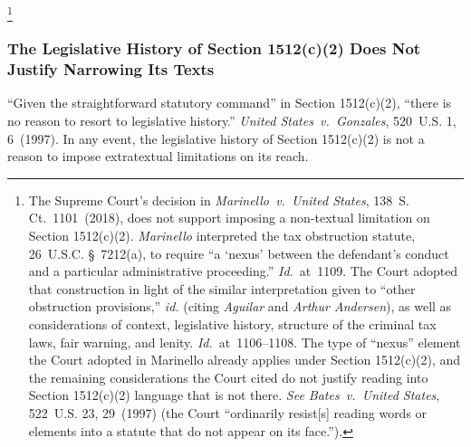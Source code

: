\footnote{The Supreme Court's decision in \textit{Marinello~v.\ United States}, 138~S. Ct.~1101~(2018), does not support imposing a non-textual limitation on Section 1512(c)(2).
\textit{Marinello} interpreted the tax obstruction statute, 26~U.S.C. \S~7212(a), to require ``a `nexus' between the defendant's conduct and a particular administrative proceeding.''
\textit{Id.}~at~1109.
The Court adopted that construction in light of the similar interpretation given to ``other obstruction provisions,'' \textit{id.} (citing \textit{Aguilar} and \textit{Arthur Andersen}), as well as considerations of context, legislative history, structure of the criminal tax laws, fair warning, and lenity.
\textit{Id.}~at~1106--1108.
The type of ``nexus'' element the Court adopted in Marinello already applies under Section 1512(c)(2), and the remaining considerations the Court cited do not justify reading into Section 1512(c)(2) language that is not there.
\textit{See Bates~v.\ United States}, 522~U.S. 23, 29~(1997) (the Court ``ordinarily resist[s] reading words or elements into a statute that do not appear on its face.'').}

\subsubsection{The Legislative History of Section 1512(c)(2) Does Not Justify Narrowing Its Texts}

``Given the straightforward statutory command'' in Section 1512(c)(2), ``there is no reason to resort to legislative history.''
\textit{United States~v.\ Gonzales}, 520~U.S. 1, 6~(1997).
In any event, the legislative history of Section 1512(c)(2) is not a reason to impose extratextual limitations on its reach.

